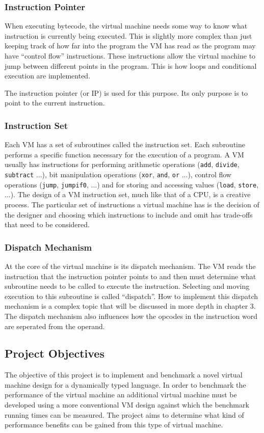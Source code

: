 \documentclass[english,a4paper]{article}
\begin{document}
\subsubsection{Instruction Pointer}
When executing bytecode, the virtual machine needs some way to know
what instruction is currently being executed. This is slightly more
complex than just keeping track of how far into the program the VM has
read as the program may have ``control flow'' instructions. These
instructions allow the virtual machine to jump between different
points in the program. This is how loops and conditional execution are
implemented.

The instruction pointer (or IP) is used for this purpose. Its only
purpose is to point to the current instruction.

\subsubsection{Instruction Set}
Each VM has a set of subroutines called the instruction set. Each
subroutine performs a specific function necessary for the execution of
a program. A VM usually has instructions for performing arithmetic
operations (\verb|add|, \verb|divide|, \verb|subtract| ...), bit
manipulation operations (\verb|xor|, \verb|and|, \verb|or| ...),
control flow operations (\verb|jump|, \verb|jumpif0|, ...) and for
storing and accessing values (\verb|load|, \verb|store|, ...). The
design of a VM instruction set, much like that of a CPU, is a creative
process. The particular set of instructions a virtual machine has is
the decision of the designer and choosing which instructions to
include and omit has trade-offs that need to be considered.

\subsubsection{Dispatch Mechanism} 
At the core of the virtual machine is its dispatch mechanism. The VM
reads the instruction that the instruction pointer points to and then
must determine what subroutine needs to be called to execute the
instruction. Selecting and moving execution to this subroutine is
called ``dispatch''. How to implement this dispatch mechanism is a
complex topic that will be discussed in more depth in chapter 3. The
dispatch mechanism also influences how the opcodes in the instruction
word are seperated from the operand.

\subsection{Project Objectives}
The objective of this project is to implement and benchmark a novel
virtual machine design for a dynamically typed language. In order to
benchmark the performance of the virtual machine an additional virtual
machine must be developed using a more conventional VM design against
which the benchmark running times can be measured. The project aims to
determine what kind of performance benefits can be gained from this
type of virtual machine.
\end{document}
